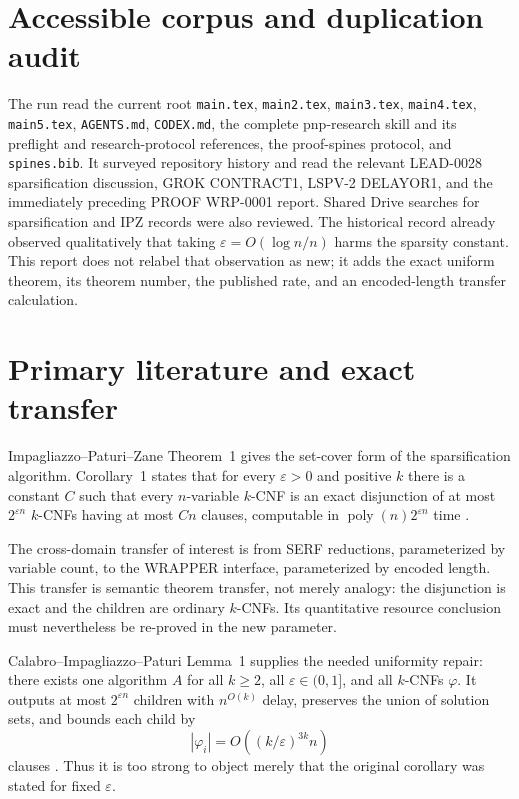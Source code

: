 \documentclass[11pt]{article}
\begin{document}
\section{Accessible corpus and duplication audit}
The run read the current root \texttt{main.tex}, \texttt{main2.tex},
\texttt{main3.tex}, \texttt{main4.tex}, \texttt{main5.tex},
\texttt{AGENTS.md}, \texttt{CODEX.md}, the complete pnp-research skill and
its preflight and research-protocol references, the proof-spines protocol,
and \texttt{spines.bib}.  It surveyed repository history and read the relevant
LEAD-0028 sparsification discussion, GROK CONTRACT1, LSPV-2 DELAYOR1, and the
immediately preceding PROOF WRP-0001 report.  Shared Drive searches for
sparsification and IPZ records were also reviewed.  The historical record
already observed qualitatively that taking $\varepsilon=O(\log n/n)$ harms
the sparsity constant.  This report does not relabel that observation as new;
it adds the exact uniform theorem, its theorem number, the published rate, and
an encoded-length transfer calculation.

\section{Primary literature and exact transfer}
Impagliazzo--Paturi--Zane Theorem~1 gives the set-cover form of the
sparsification algorithm.  Corollary~1 states that for every
$\varepsilon>0$ and positive $k$ there is a constant $C$ such that every
$n$-variable $k$-CNF is an exact disjunction of at most
$2^{\varepsilon n}$ $k$-CNFs having at most $Cn$ clauses, computable in
$\operatorname{poly}(n)2^{\varepsilon n}$ time \cite{ipz2001}.

The cross-domain transfer of interest is from SERF reductions, parameterized
by variable count, to the WRAPPER interface, parameterized by encoded length.
This transfer is semantic theorem transfer, not merely analogy: the disjunction
is exact and the children are ordinary $k$-CNFs.  Its quantitative resource
conclusion must nevertheless be re-proved in the new parameter.

Calabro--Impagliazzo--Paturi Lemma~1 supplies the needed uniformity repair:
there exists one algorithm $A$ for all $k\ge2$, all
$\varepsilon\in(0,1]$, and all $k$-CNFs $\varphi$.  It outputs at most
$2^{\varepsilon n}$ children with $n^{O(k)}$ delay, preserves the union of
solution sets, and bounds each child by
\[
 |\varphi_i|=O\!\left((k/\varepsilon)^{3k}n\right)
\]
clauses \cite{calabro2010}.  Thus it is too strong to object merely that the
original corollary was stated for fixed $\varepsilon$.
\end{document}
